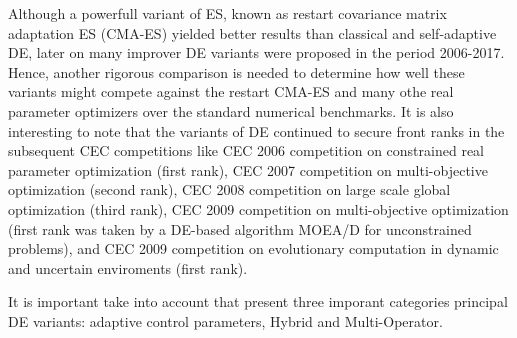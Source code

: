 Although a powerfull variant of ES, known as restart covariance matrix adaptation ES (CMA-ES) yielded better results than classical and self-adaptive DE, later on many improver DE variants were proposed in the period 2006-2017.
%
Hence, another rigorous comparison is needed to determine how well these variants might compete against the restart CMA-ES and many othe real parameter optimizers over the standard numerical benchmarks.
%
It is also interesting to note that the variants of DE continued to secure front ranks in the subsequent CEC competitions like CEC 2006 competition on constrained real parameter optimization (first rank), CEC 2007 competition on multi-objective optimization (second rank), CEC 2008 competition on large scale global optimization (third rank), CEC 2009 competition on multi-objective optimization (first rank was taken by a DE-based algorithm MOEA/D for unconstrained problems), and CEC 2009 competition on evolutionary computation in dynamic and uncertain enviroments (first rank).
%


It is important take into account that present three imporant categories principal DE variants: adaptive control parameters, Hybrid and Multi-Operator.
